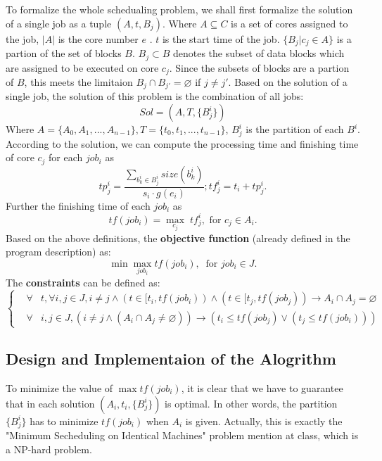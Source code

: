 \documentclass{llncs}
\begin{document}
  To formalize the whole schedualing problem, we shall first formalize the solution of a single job as a tuple $(A,t,B_j)$.
  Where $A \subseteq C$ is a set of cores assigned to the job, $|A|$ is the core number $e$ . $t$ is the start time of the job. $\{B_j | c_j \in A\}$ is a partion of the set of blocks $B$.
 $B_j \subset B$ denotes the subset of data blocks which are assigned to be executed on core $c_j$. Since the subsets of blocks are a partion of $B$, this meets the limitaion $B_{j} \cap B_{j'} = \varnothing$ if $j \neq j'$.
 Based on the solution of a single job, the solution of this problem is the combination of all jobs:
 \begin{equation*}
 Sol = (A,T,\{B_j^i\})
 \end{equation*}
 Where $A = \{A_0,A_1,...,A_{n-1}\}, T = \{t_0,t_1,...,t_{n-1}\}$, ${B_j^i}$ is the partition of each $B^i$. According to the solution, we can compute the processing time and finishing time of core $c_j$ for each $job_i$ as
 \begin{equation*}
 tp^i_{j} = \frac{\sum_{b^i_{k} \in B^i_{j}}size(b^i_{k})}{s_i \cdot g(e_i)}; tf^i_{j} = t_i + tp^i_{j}.
 \end{equation*}
Further the finishing time of each $job_i$ as
 \begin{equation*}
 tf(job_i) = \max_{c_j} \; tf^i_{j}, \text{ for } c_j \in A_i.
 \end{equation*}
Based on the above definitions, the \textbf{objective function} (already defined in the program description) as:
  \begin{equation*}
  \min \max_{job_i} tf(job_i), \ \text{ for } job_i \in J.
  \end{equation*}
The \textbf{constraints} can be defined as:
\begin{equation} \label{constraints-job0}
\left\{
\begin{array}{ccl}
 &\forall &t, \forall i, j \in J, i \neq j \land (t \in [t_i,tf(job_i)) \land (t \in [t_j,tf(job_j))
 \rightarrow A_i \cap A_j = \varnothing \\
 &\forall &i, j \in J, (i \neq j \land (A_i \cap A_j \neq \varnothing)) \rightarrow (t_i \leq tf(job_j) \lor (t_j \leq tf(job_i)))
\end{array}
\right.
\end{equation}

\subsection{Design and Implementaion of the Alogrithm}\label{subsec-algo1}
  To minimize the value of $\max tf(job_i) $, it is clear that we have to guarantee that in each solution $(A_i,t_i,\{B_j^i\})$ is optimal. In other words, the partition  $\{B_j^i\}$ has to minimize $tf(job_i)$ when $A_i$ is given. Actually, this is exactly the  "Minimum Secheduling on Identical Machines" problem mention at class, which is a NP-hard problem.
\end{document}
